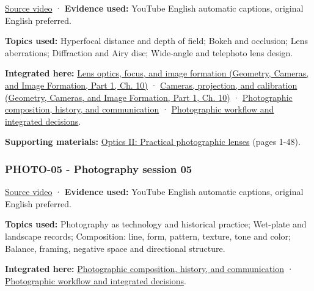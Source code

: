\href{https://www.youtube.com/watch?v=Y6kwPir0uMM}{Source video} · \textbf{Evidence used:} YouTube English automatic captions, original English preferred.

\textbf{Topics used:} Hyperfocal distance and depth of field; Bokeh and occlusion; Lens aberrations; Diffraction and Airy disc; Wide-angle and telephoto lens design.

\textbf{Integrated here:} \href{../03-Geometry-Cameras-and-Image-Formation-P01/main.pdf\#03-visual-computing-i-ch003-lens-optics-focus-and-image-formation}{Lens optics, focus, and image formation (Geometry, Cameras, and Image Formation, Part 1, Ch. 10)} · \href{../03-Geometry-Cameras-and-Image-Formation-P01/main.pdf\#03-visual-computing-i-ch003-cameras-projection-and-calibration}{Cameras, projection, and calibration (Geometry, Cameras, and Image Formation, Part 1, Ch. 10)} · \hyperref[04-visual-computing-ii-ch034-photographic-composition-history-and-communication]{Photographic composition, history, and communication} · \hyperref[04-visual-computing-ii-ch034-photographic-workflow-and-integrated-decisions]{Photographic workflow and integrated decisions}.

\textbf{Supporting materials:} \href{https://drive.google.com/open?id=0B6w2XfPHEcZYTnZIR2VpWThHM0U}{Optics II: Practical photographic lenses} (pages 1-48).

\subsubsection{PHOTO-05 - Photography session 05}\label{04-visual-computing-ii-ch036-photo-05---photography-session-05}

\hypertarget{04-visual-computing-ii-ch036-photo-05---photography-session-05}{}

\href{https://www.youtube.com/watch?v=VCcDJAiObEw}{Source video} · \textbf{Evidence used:} YouTube English automatic captions, original English preferred.

\textbf{Topics used:} Photography as technology and historical practice; Wet-plate and landscape records; Composition: line, form, pattern, texture, tone and color; Balance, framing, negative space and directional structure.

\textbf{Integrated here:} \hyperref[04-visual-computing-ii-ch034-photographic-composition-history-and-communication]{Photographic composition, history, and communication} · \hyperref[04-visual-computing-ii-ch034-photographic-workflow-and-integrated-decisions]{Photographic workflow and integrated decisions}.

